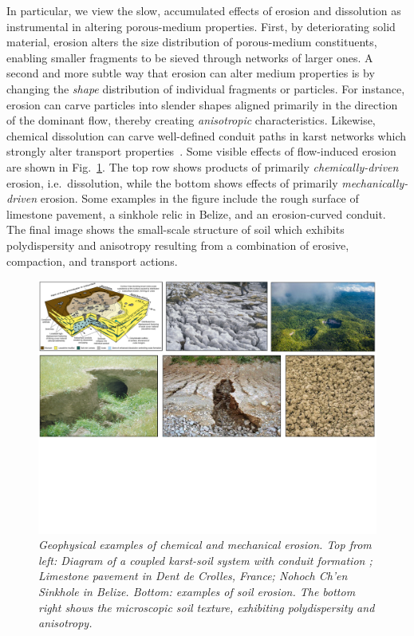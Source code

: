 \documentclass[11pt]{article}
\begin{document}
In particular, we view the slow, accumulated effects of erosion and dissolution as instrumental in altering porous-medium properties. First, by deteriorating solid material, erosion alters the size distribution of porous-medium constituents, enabling smaller fragments to be sieved through networks of larger ones. A second and more subtle way that erosion can alter medium properties is by changing the {\em shape} distribution of individual fragments or particles. For instance, erosion can carve particles into slender shapes aligned primarily in the direction of the dominant flow, thereby creating {\em anisotropic} characteristics. Likewise, chemical dissolution can carve well-defined conduit paths in karst networks which strongly alter transport properties~\cite{szymczak2009wormhole}. Some visible effects of flow-induced erosion are shown in Fig.~\ref{collage}. The top row shows products of primarily {\em chemically-driven} erosion, i.e.~dissolution, while the bottom shows effects of primarily {\em mechanically-driven} erosion. Some examples in the figure include the rough surface of limestone pavement, a sinkhole relic in Belize, and an erosion-curved conduit. The final image shows the small-scale structure of soil which exhibits polydispersity and anisotropy resulting from a combination of erosive, compaction, and transport actions.

\begin{figure}%
\begin{center}
\includegraphics[width = 0.99 \textwidth]{./figs/collage.pdf}
\caption{\label{collage} \em Geophysical examples of chemical and mechanical erosion. Top from left: Diagram of a coupled karst-soil system with conduit formation \cite{watson2019sinkholes}; Limestone pavement in Dent de Crolles, France; Nohoch Ch’en Sinkhole in Belize. Bottom: examples of soil erosion. The bottom right shows the microscopic soil texture, exhibiting polydispersity and anisotropy.}
\end{center}
\end{figure}
\end{document}
